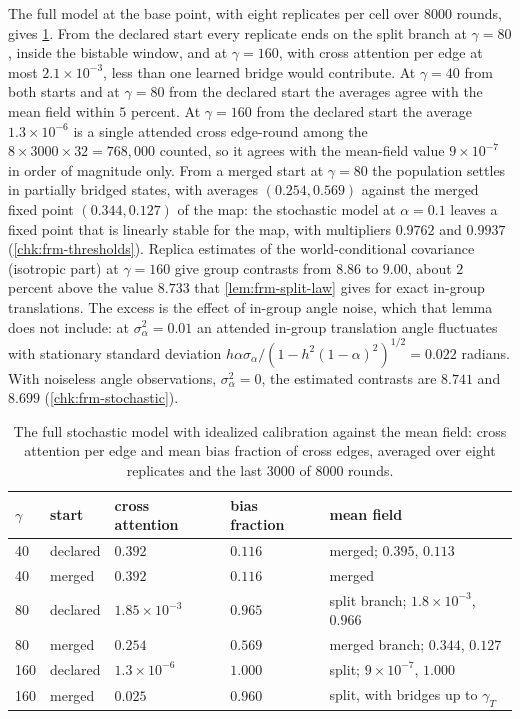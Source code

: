 \begin{observation}\label{obs:frm-stochastic}
The full model at the base point, with eight replicates per cell over 8000 rounds, gives \cref{tab:frm-stochastic}. From the declared start every replicate ends on the split branch at $\gamma=80$, inside the bistable window, and at $\gamma=160$, with cross attention per edge at most $2.1\times10^{-3}$, less than one learned bridge would contribute. At $\gamma=40$ from both starts and at $\gamma=80$ from the declared start the averages agree with the mean field within $5$ percent. At $\gamma=160$ from the declared start the average $1.3\times10^{-6}$ is a single attended cross edge-round among the $8\times3000\times32=768{,}000$ counted, so it agrees with the mean-field value $9\times10^{-7}$ in order of magnitude only. From a merged start at $\gamma=80$ the population settles in partially bridged states, with averages $(0.254,0.569)$ against the merged fixed point $(0.344,0.127)$ of the map: the stochastic model at $\alpha=0.1$ leaves a fixed point that is linearly stable for the map, with multipliers $0.9762$ and $0.9937$ (\cref{chk:frm-thresholds}). Replica estimates of the world-conditional covariance (isotropic part) at $\gamma=160$ give group contrasts from $8.86$ to $9.00$, about $2$ percent above the value $8.733$ that \cref{lem:frm-split-law} gives for exact in-group translations. The excess is the effect of in-group angle noise, which that lemma does not include: at $\sigma_\alpha^2=0.01$ an attended in-group translation angle fluctuates with stationary standard deviation $h\alpha\sigma_\alpha/(1-h^2(1-\alpha)^2)^{1/2}=0.022$ radians. With noiseless angle observations, $\sigma_\alpha^2=0$, the estimated contrasts are $8.741$ and $8.699$ (\cref{chk:frm-stochastic}).
\end{observation}

\begin{table}[t]
\centering
\caption{The full stochastic model with idealized calibration against the mean field: cross attention per edge and mean bias fraction of cross edges, averaged over eight replicates and the last 3000 of 8000 rounds.}
\label{tab:frm-stochastic}
\begin{tabular}{@{}lllll@{}}
\toprule
$\gamma$ & start & cross attention & bias fraction & mean field \\
\midrule
40 & declared & $0.392$ & $0.116$ & merged; $0.395$, $0.113$ \\
40 & merged & $0.392$ & $0.116$ & merged \\
80 & declared & $1.85\times10^{-3}$ & $0.965$ & split branch; $1.8\times10^{-3}$, $0.966$ \\
80 & merged & $0.254$ & $0.569$ & merged branch; $0.344$, $0.127$ \\
160 & declared & $1.3\times10^{-6}$ & $1.000$ & split; $9\times10^{-7}$, $1.000$ \\
160 & merged & $0.025$ & $0.960$ & split, with bridges up to $\gamma_T$ \\
\bottomrule
\end{tabular}
\end{table}

